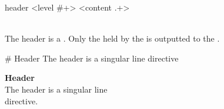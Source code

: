 \begin{identifier}{header}
<level #+> <content .+>
\end{identifier}
 \\

The header is a . Only the  held by the  is outputted to the .

\begin{examples}
  \begin{examplesource}
# Header
The header is a singular line
directive
  \end{examplesource}
  \begin{exampleoutput}
    \textbf{\quad\Large Header}\\
    The header is a singular line\\
    directive.
  \end{exampleoutput}
\end{examples}

